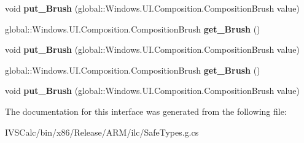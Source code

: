 \begin{DoxyCompactItemize}
\mbox{\label{interface_windows_1_1_u_i_1_1_composition_1_1_i_sprite_visual_ac9179b3904c6513518582cb560901df5}} 
void {\bfseries put\+\_\+\+Brush} (global\+::\+Windows.\+U\+I.\+Composition.\+Composition\+Brush value)
\item 
\mbox{\label{interface_windows_1_1_u_i_1_1_composition_1_1_i_sprite_visual_a3b31b335015361eb884a44af879982d1}} 
global\+::\+Windows.\+U\+I.\+Composition.\+Composition\+Brush {\bfseries get\+\_\+\+Brush} ()
\item 
\mbox{\label{interface_windows_1_1_u_i_1_1_composition_1_1_i_sprite_visual_ac9179b3904c6513518582cb560901df5}} 
void {\bfseries put\+\_\+\+Brush} (global\+::\+Windows.\+U\+I.\+Composition.\+Composition\+Brush value)
\item 
\mbox{\label{interface_windows_1_1_u_i_1_1_composition_1_1_i_sprite_visual_a3b31b335015361eb884a44af879982d1}} 
global\+::\+Windows.\+U\+I.\+Composition.\+Composition\+Brush {\bfseries get\+\_\+\+Brush} ()
\item 
\mbox{\label{interface_windows_1_1_u_i_1_1_composition_1_1_i_sprite_visual_ac9179b3904c6513518582cb560901df5}} 
void {\bfseries put\+\_\+\+Brush} (global\+::\+Windows.\+U\+I.\+Composition.\+Composition\+Brush value)
\end{DoxyCompactItemize}


The documentation for this interface was generated from the following file\+:\begin{DoxyCompactItemize}
\item 
I\+V\+S\+Calc/bin/x86/\+Release/\+A\+R\+M/ilc/Safe\+Types.\+g.\+cs\end{DoxyCompactItemize}
